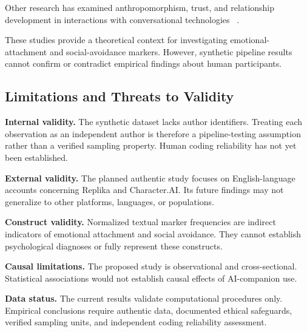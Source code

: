 Other research has examined anthropomorphism,
trust, and relationship development in interactions
with conversational technologies~
\cite{seymourExploringInteractionsTrust2021}.

These studies provide a theoretical context for
investigating emotional-attachment and social-avoidance
markers. However, synthetic pipeline results cannot
confirm or contradict empirical findings about
human participants.

\subsection{Limitations and Threats to Validity}
\label{subsec:limitations}

\textbf{Internal validity.}
The synthetic dataset lacks author identifiers.
Treating each observation as an independent author
is therefore a pipeline-testing assumption rather
than a verified sampling property. Human coding
reliability has not yet been established.

\textbf{External validity.}
The planned authentic study focuses on English-language
accounts concerning Replika and Character.AI.
Its future findings may not generalize to other
platforms, languages, or populations.

\textbf{Construct validity.}
Normalized textual marker frequencies are indirect
indicators of emotional attachment and social
avoidance. They cannot establish psychological
diagnoses or fully represent these constructs.

\textbf{Causal limitations.}
The proposed study is observational and
cross-sectional. Statistical associations would
not establish causal effects of AI-companion use.

\textbf{Data status.}
The current results validate computational
procedures only. Empirical conclusions require
authentic data, documented ethical safeguards,
verified sampling units, and independent coding
reliability assessment.
